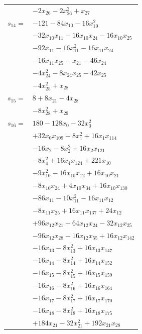 \begin{longtable}{@{}r@{\;}l@{}}
 & \(\displaystyle -2x_{26} -2x_{26}^{2} +x_{27}\) \\[3pt]
\(s_{14}=\) & \(\displaystyle -121 -84x_{10} -16x_{10}^{2}\) \\
 & \(\displaystyle -32x_{10}x_{11} -16x_{10}x_{24} -16x_{10}x_{25}\) \\
 & \(\displaystyle -92x_{11} -16x_{11}^{2} -16x_{11}x_{24}\) \\
 & \(\displaystyle -16x_{11}x_{25} -x_{21} -46x_{24}\) \\
 & \(\displaystyle -4x_{24}^{2} -8x_{24}x_{25} -42x_{25}\) \\
 & \(\displaystyle -4x_{25}^{2} +x_{28}\) \\[3pt]
\(s_{15}=\) & \(\displaystyle 8 +8x_{21} -4x_{28}\) \\
 & \(\displaystyle -8x_{28}^{2} +x_{29}\) \\[3pt]
\(s_{16}=\) & \(\displaystyle 180 -128x_{0} -32x_{0}^{2}\) \\
 & \(\displaystyle +32x_{0}x_{109} -8x_{1}^{2} +16x_{1}x_{114}\) \\
 & \(\displaystyle -16x_{2} -8x_{2}^{2} +16x_{2}x_{121}\) \\
 & \(\displaystyle -8x_{4}^{2} +16x_{4}x_{124} +221x_{10}\) \\
 & \(\displaystyle -9x_{10}^{2} -16x_{10}x_{12} +16x_{10}x_{21}\) \\
 & \(\displaystyle -8x_{10}x_{24} +4x_{10}x_{34} +16x_{10}x_{130}\) \\
 & \(\displaystyle -86x_{11} -10x_{11}^{2} -16x_{11}x_{12}\) \\
 & \(\displaystyle -8x_{11}x_{25} +16x_{11}x_{137} +24x_{12}\) \\
 & \(\displaystyle +96x_{12}x_{21} +64x_{12}x_{24} -32x_{12}x_{25}\) \\
 & \(\displaystyle -96x_{12}x_{28} -16x_{12}x_{55} +16x_{12}x_{142}\) \\
 & \(\displaystyle -16x_{13} -8x_{13}^{2} +16x_{13}x_{147}\) \\
 & \(\displaystyle -16x_{14} -8x_{14}^{2} +16x_{14}x_{152}\) \\
 & \(\displaystyle -16x_{15} -8x_{15}^{2} +16x_{15}x_{159}\) \\
 & \(\displaystyle -16x_{16} -8x_{16}^{2} +16x_{16}x_{164}\) \\
 & \(\displaystyle -16x_{17} -8x_{17}^{2} +16x_{17}x_{170}\) \\
 & \(\displaystyle -16x_{18} -8x_{18}^{2} +16x_{18}x_{175}\) \\
 & \(\displaystyle +184x_{21} -32x_{21}^{2} +192x_{21}x_{28}\) \\

\end{longtable}
